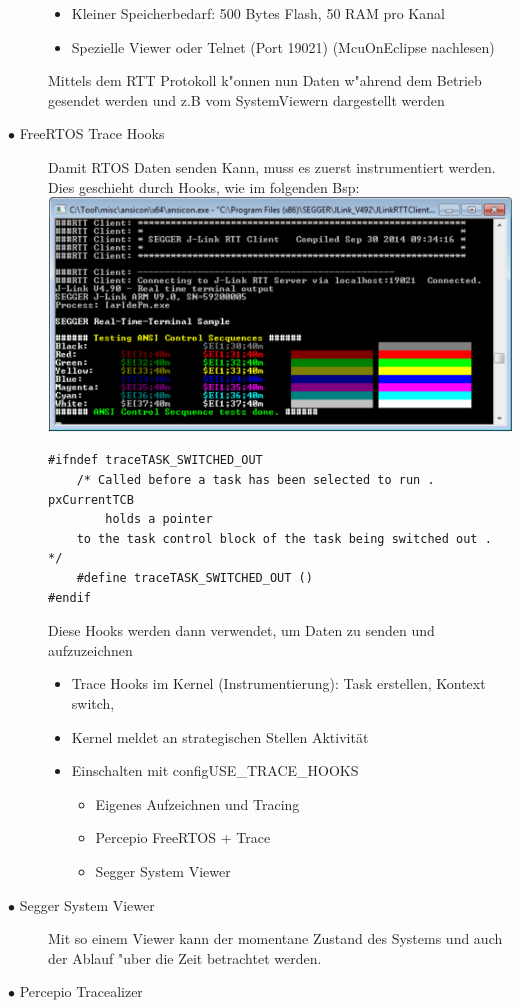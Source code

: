 \documentclass[a4paper, 8pt]{extarticle}
\begin{document}
\begin{multicols*}{3}
\begin{description}
\begin{itemize}
							\item Kleiner Speicherbedarf: 500 Bytes Flash, 50 RAM pro Kanal
							\item Spezielle Viewer oder Telnet (Port 19021) (McuOnEclipse nachlesen)
						\end{itemize}
						Mittels dem RTT Protokoll k"onnen nun Daten w"ahrend dem Betrieb gesendet werden und z.B vom SystemViewern dargestellt werden 
						\item[$\bullet$ FreeRTOS Trace Hooks]
						Damit RTOS Daten senden Kann, muss es zuerst instrumentiert werden. Dies geschieht durch Hooks, wie im folgenden Bsp:
						\includegraphics[width=0.6\linewidth,left]{img/Segger_RTT_Client.PNG}	 
						\begin{lstlisting}
#ifndef traceTASK_SWITCHED_OUT
	/* Called before a task has been selected to run . pxCurrentTCB
		holds a pointer
	to the task control block of the task being switched out . */
	#define traceTASK_SWITCHED_OUT ()
#endif
						\end{lstlisting}
						Diese Hooks werden dann verwendet, um Daten zu senden und aufzuzeichnen
						\begin{itemize}
							\item Trace Hooks im Kernel (Instrumentierung): Task erstellen, Kontext switch, 
							\item Kernel meldet an strategischen Stellen Aktivität
							\item Einschalten mit configUSE\_TRACE\_HOOKS
								  \begin{itemize}
									\item Eigenes Aufzeichnen und Tracing
									\item Percepio FreeRTOS + Trace
									\item Segger System Viewer
								  \end{itemize}	
						\end{itemize}
						\item[$\bullet$ Segger System Viewer]
							Mit so einem Viewer kann der momentane Zustand des Systems und auch der Ablauf "uber die Zeit betrachtet werden.
						\item[$\bullet$ Percepio Tracealizer]
		 

\end{description}
\end{multicols*}
\end{document}
